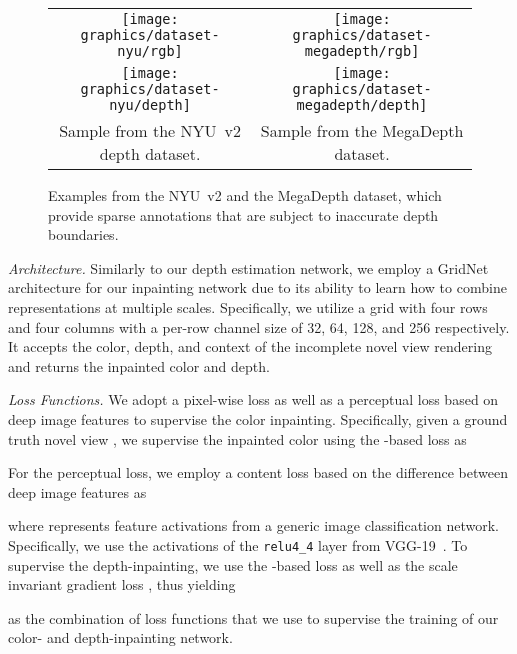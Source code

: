 \documentclass[acmtog,authorversion]{acmart}
\newlength{\itemwidth}
\begin{document}
\begin{figure}\centering
    \setlength{\tabcolsep}{0.05cm}
    \setlength{\itemwidth}{4.19cm}
    \begin{tabular}{cc}
            \texttt{[image: graphics/dataset-nyu/rgb]}
        &
            \texttt{[image: graphics/dataset-megadepth/rgb]}
        \\
            \texttt{[image: graphics/dataset-nyu/depth]}
        &
            \texttt{[image: graphics/dataset-megadepth/depth]}
        \\
            \footnotesize Sample from the NYU~v2 depth dataset.
        &
            \footnotesize Sample from the MegaDepth dataset.
        \\
    \end{tabular}\vspace{-0.2cm}
    \caption{Examples from the NYU~v2 and the MegaDepth dataset, which provide sparse annotations that are subject to inaccurate depth boundaries.}\vspace{-0.2cm}
    \label{fig:otherdata}
\end{figure}

\textit{Architecture.} Similarly to our depth estimation network, we employ a GridNet~\cite{Fourure_BMVC_2017} architecture for our inpainting network due to its ability to learn how to combine representations at multiple scales. Specifically, we utilize a grid with four rows and four columns with a per-row channel size of 32, 64, 128, and 256 respectively. It accepts the color, depth, and context of the incomplete novel view rendering and returns the inpainted color and depth.

\textit{Loss Functions.} We adopt a pixel-wise  loss as well as a perceptual loss based on deep image features to supervise the color inpainting. Specifically, given a ground truth novel view , we supervise the inpainted color  using the -based loss as

For the perceptual loss, we employ a content loss based on the difference between deep image features as

where  represents feature activations from a generic image classification network. Specifically, we use the activations of the \verb|relu4_4| layer from VGG-19~\cite{Simonyan_ARXIV_2014}. To supervise the depth-inpainting, we use the -based loss  as well as the scale invariant gradient loss , thus yielding

as the combination of loss functions that we use to supervise the training of our color- and depth-inpainting network.
\end{document}

